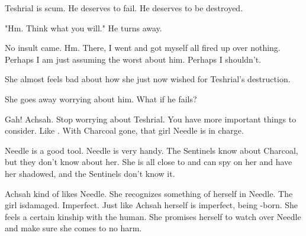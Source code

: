 Teshrial is scum. 
He deserves to fail. 
He deserves to be destroyed. 

"Hm. 
 Think what you will."
He turns away. 

No insult came. 
Hm. 
There, I went and got myself all fired up over nothing. 
Perhaps I am just assuming the worst about him. 
Perhaps I shouldn't. 

She almost feels bad about how she just now wished for Teshrial's destruction. 

She goes away worrying about him.
What if he fails?

Gah! 
Achsah. 
Stop worrying about Teshrial. 
You have more important things to consider. 
Like \Malcur. 
With Charcoal gone, that girl Needle is in charge. 

Needle is a good tool. 
Needle is very handy. 
The Sentinels know about Charcoal, but they don't know about her. 
She is all close to \Tiroco{} and can spy on her and have her shadowed, and the Sentinels don't know it. 

Achsah kind of likes Needle. 
She recognizes something of herself in Needle. 
The girl is\prikker damaged. 
Imperfect. 
Just like Achsah herself is imperfect, being \bezed-born. 
She feels a certain kinship with the human. 
She promises herself to watch over Needle and make sure she comes to no harm. 










